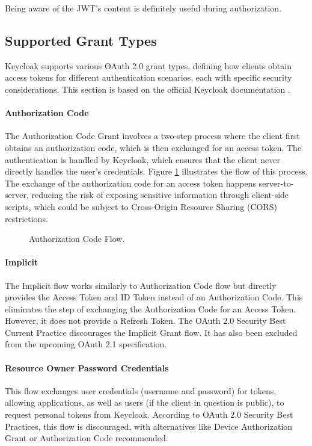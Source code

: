 Being aware of the JWT's content is definitely useful during authorization.

\subsection{Supported Grant Types}
Keycloak supports various OAuth 2.0 grant types, defining how clients obtain access tokens for different authentication scenarios, each with specific security considerations. This section is based on the official Keycloak documentation \Parencite{keycloakGrantTypes}.

\paragraph{Authorization Code}\label{sec:auth_code}
The Authorization Code Grant involves a two-step process where the client first obtains an authorization code, which is then exchanged for an access token. The authentication is handled by Keycloak, which ensures that the client never directly handles the user's credentials. Figure \ref{fig:authorization_code_flow} illustrates the flow of this process. The exchange of the authorization code for an access token happens server-to-server, reducing the risk of exposing sensitive information through client-side scripts, which could be subject to Cross-Origin Resource Sharing (CORS) restrictions.

\begin{figure}[h]
    \centering
    
    \caption{Authorization Code Flow.}
    \label{fig:authorization_code_flow}
\end{figure}

\paragraph{Implicit}
The Implicit flow works similarly to Authorization Code flow but directly provides the Access Token and ID Token instead of an Authorization Code. This eliminates the step of exchanging the Authorization Code for an Access Token. However, it does not provide a Refresh Token. The OAuth 2.0 Security Best Current Practice discourages the Implicit Grant flow. It has also been excluded from the upcoming OAuth 2.1 specification.

\paragraph{Resource Owner Password Credentials}
This flow exchanges user credentials (username and password) for tokens, allowing applications, as well as users (if the client in question is public), to request personal tokens from Keycloak. According to OAuth 2.0 Security Best Practices, this flow is discouraged, with alternatives like Device Authorization Grant or Authorization Code recommended. 

